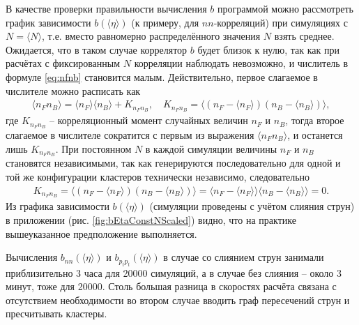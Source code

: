В качестве проверки правильности вычисления $b$ программой можно рассмотреть график зависимости $b(\langle \eta \rangle)$ (к примеру, для $nn$-корреляций) при симуляциях с $N = \langle N \rangle$, т.е. вместо равномерно распределённого значения $N$ взять среднее. Ожидается, что в таком случае коррелятор $b$ будет близок к нулю, так как при расчётах с фиксированным $N$ корреляции наблюдать невозможно, и числитель в формуле \ref{eq:nfnb} становится малым. Действительно, первое слагаемое в числителе можно расписать как
\begin{align*}
	\langle n_F n_B \rangle = \langle n_F \rangle \langle n_B \rangle + K_{n_F n_B}, \quad K_{n_F n_B} = \langle (n_F - \langle n_F \rangle)(n_B - \langle n_B \rangle) \rangle,
\end{align*}
где $K_{n_F n_B}$ -- корреляционный момент случайных величин $n_F$ и $n_B$, тогда второе слагаемое в числителе сократится с первым из выражения $\langle n_F n_B \rangle$, и останется лишь $K_{n_F n_B}$. При постоянном $N$ в каждой симуляции величины $n_F$ и $n_B$ становятся независимыми, так как генерируются последовательно для одной и той же конфигурации кластеров технически независимо, следовательно
\begin{align*}
	K_{n_F n_B} = \langle (n_F - \langle n_F \rangle)(n_B - \langle n_B \rangle) \rangle = \langle n_F - \langle n_F \rangle \rangle \langle n_B - \langle n_B \rangle \rangle = 0.
\end{align*}
Из графика зависимости $b(\langle \eta \rangle)$ (симуляции проведены с учётом слияния струн) в приложении (рис. \ref{fig:bEtaConstNScaled}) видно, что на практике вышеуказанное предположение выполняется.

Вычисления $b_{nn}(\langle \eta \rangle)$ и $b_{p_tp_t}(\langle \eta \rangle)$ в случае со слиянием струн занимали приблизительно 3 часа для 20000 симуляций, а в случае без слияния -- около 3 минут, тоже для 20000. Столь большая разница в скоростях расчёта связана с отсутствием необходимости во втором случае вводить граф пересечений струн и пресчитывать кластеры.
